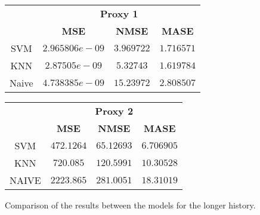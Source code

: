 \begin{figure}[!h]
\centering
\begin{minipage}{\textwidth}
\begin{minipage}{0.5\textwidth}
\begin{center}
\vskip10pt
   \begin{footnotesize}
   \begin{tabular}{|c|c|c|c|}
   \hline
   & \multicolumn{3}{|c|}{\textbf{Proxy 1}} \\ \cline{2-4}
   & \textbf{MSE} & \textbf{NMSE} & \textbf{MASE}          \\ \hline
   SVM  & $2.965806e-09$ &$3.969722$ & $1.716571$         \\ 
   KNN & $2.87505e-09$ & $5.32743$& $1.619784$ \\ 
   Naive & $4.738385e-09$ & $15.23972$& $2.808507$     \\ 
   \hline
   \end{tabular}
   \end{footnotesize}
\end{center}
\end{minipage}
\begin{minipage}{0.5\textwidth}
\begin{center}
\vskip12pt
   \begin{footnotesize}
   \begin{tabular}{|c|c|c|c|}
   \hline
   & \multicolumn{3}{|c|}{\textbf{Proxy 2}} \\ \cline{2-4}
   & \textbf{MSE} & \textbf{NMSE} & \textbf{MASE}          \\ \hline
   SVM  & $472.1264$  & $65.12693$ &  $6.706905$   \\ 
   KNN & $720.085$ &$120.5991$& $10.30528$          \\ 
   NAIVE & $2223.865$  & $281.0051$ & $18.31019$     \\ 
   \hline
   \end{tabular}
   \end{footnotesize}
\end{center}
\end{minipage}
\end{minipage}
\caption{Comparison of the results between the models for the longer history.}
\label{fig:compare10y}
\end{figure}